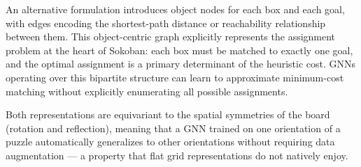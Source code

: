An alternative formulation introduces object nodes for each box and each goal, with edges encoding the shortest-path distance or reachability relationship between them. This object-centric graph explicitly represents the assignment problem at the heart of Sokoban: each box must be matched to exactly one goal, and the optimal assignment is a primary determinant of the heuristic cost. GNNs operating over this bipartite structure can learn to approximate minimum-cost matching without explicitly enumerating all possible assignments.

Both representations are equivariant to the spatial symmetries of the board (rotation and reflection), meaning that a GNN trained on one orientation of a puzzle automatically generalizes to other orientations without requiring data augmentation --- a property that flat grid representations do not natively enjoy.
